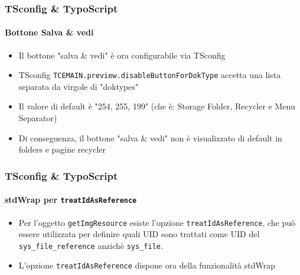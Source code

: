 \begin{frame}[fragile]
	\frametitle{TSconfig \& TypoScript}
	\framesubtitle{Bottone Salva \& vedi}

	\begin{itemize}

		\item Il bottone "salva \& vedi" è ora configurabile via TSconfig

		\item TSconfig \texttt{TCEMAIN.preview.disableButtonForDokType} accetta una lista separata da virgole di "doktypes"

		\item Il valore di default è "254, 255, 199" (che è: Storage Folder, Recycler e Menu Separator)

		\item Di conseguenza, il bottone "salva \& vedi" non è visualizzato di default in folders e pagine recycler

	\end{itemize}

\end{frame}

\begin{frame}[fragile]
	\frametitle{TSconfig \& TypoScript}
	\framesubtitle{stdWrap per \texttt{treatIdAsReference}}

	\begin{itemize}

		\item Per l'oggetto \texttt{getImgResource} esiste l'opzione \texttt{treatIdAsReference},
			che può essere utilizzata per definire quali UID sono trattati come UID del \texttt{sys\_file\_reference}
			anzichè \texttt{sys\_file}.

		\item L'opzione \texttt{treatIdAsReference} dispone ora della funzionalità stdWrap

	\end{itemize}

\end{frame}

